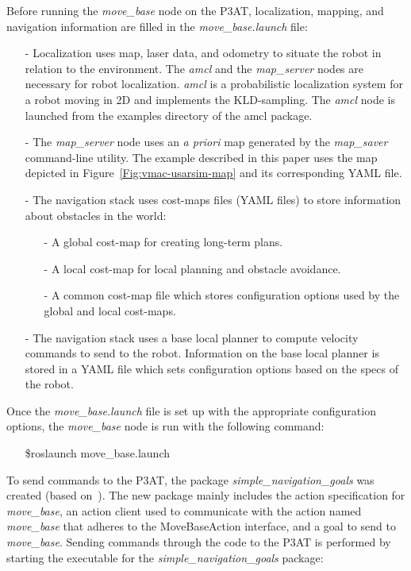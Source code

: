 Before running the {\it move\_base} node on the P3AT, localization, mapping, and navigation information are filled in the {\it move\_base.launch} file:
\begin{itemize}
 \item [-] Localization uses map, laser data, and odometry to situate the robot in relation to the environment. The {\it amcl} and the {\it map\_server} nodes are necessary for robot localization. {\it amcl} is a probabilistic localization system for a robot moving in 2D and implements the KLD-sampling\cite{DIETER.IJRS.2003}. The {\it amcl} node is launched from the examples directory of the amcl package.
\item [-] The {\it map\_server} node uses an {\it a priori} map generated by the {\it map\_saver} command-line utility. The example described in this paper uses the map depicted in Figure~\ref{Fig:vmac-usarsim-map} and its corresponding YAML file.
\item [-] The navigation stack uses cost-maps files (YAML files) to store information about obstacles in the world:
\begin{itemize}
\item [-] A global cost-map for creating long-term plans.
\item [-] A local cost-map for local planning and obstacle avoidance.
\item [-] A common cost-map file which stores configuration options used by the global and local cost-maps.
\end{itemize}
\item [-] The navigation stack uses a base local planner to compute velocity commands to send to the robot. Information on the base local planner is stored in a YAML file which sets configuration options based on the specs of the robot.
\end{itemize}

Once the {\it move\_base.launch} file is set up with the appropriate configuration options, the {\it move\_base} node is run with the following command:

\begin{itemize}
\item[]\$roslaunch move\_base.launch
\end{itemize}

To send commands to the P3AT, the package {\it simple\_navigation\_goals} was created (based on~\cite{SendingSimpleGoals}). The new package mainly includes the action specification for {\it move\_base}, an action client used to communicate with the action named {\it move\_base} that adheres to the MoveBaseAction interface, and a goal to send to {\it move\_base}. Sending commands through the code to the P3AT is performed by starting the executable for the {\it simple\_navigation\_goals} package:

